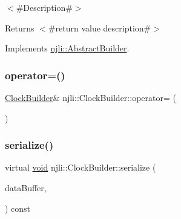 $<$\#\+Description\#$>$

\begin{DoxyReturn}{Returns}
$<$\#return value description\#$>$ 
\end{DoxyReturn}


Implements \mbox{\hyperlink{classnjli_1_1_abstract_builder_a3e6e553e06d1ca30517ad5fb0bd4d000}{njli\+::\+Abstract\+Builder}}.

\mbox{\label{classnjli_1_1_clock_builder_af528ee817dd44638a10c78227290337e}} 
\subsubsection{\texorpdfstring{operator=()}{operator=()}}
{\footnotesize\ttfamily \mbox{\hyperlink{classnjli_1_1_clock_builder}{Clock\+Builder}}\& njli\+::\+Clock\+Builder\+::operator= (\begin{DoxyParamCaption}\item[{const \mbox{\hyperlink{classnjli_1_1_clock_builder}{Clock\+Builder}} \&}]{ }\end{DoxyParamCaption})\hspace{0.3cm}{\ttfamily [protected]}}

\mbox{\label{classnjli_1_1_clock_builder_af1583f2692fefb0a7be4ac89072d3c2c}} 
\subsubsection{\texorpdfstring{serialize()}{serialize()}}
{\footnotesize\ttfamily virtual \mbox{\hyperlink{_thread_8h_af1e856da2e658414cb2456cb6f7ebc66}{void}} njli\+::\+Clock\+Builder\+::serialize (\begin{DoxyParamCaption}\item[{\mbox{\hyperlink{_thread_8h_af1e856da2e658414cb2456cb6f7ebc66}{void}} $\ast$}]{data\+Buffer,  }\item[{bt\+Serializer $\ast$}]{ }\end{DoxyParamCaption}) const\hspace{0.3cm}{\ttfamily [virtual]}}



